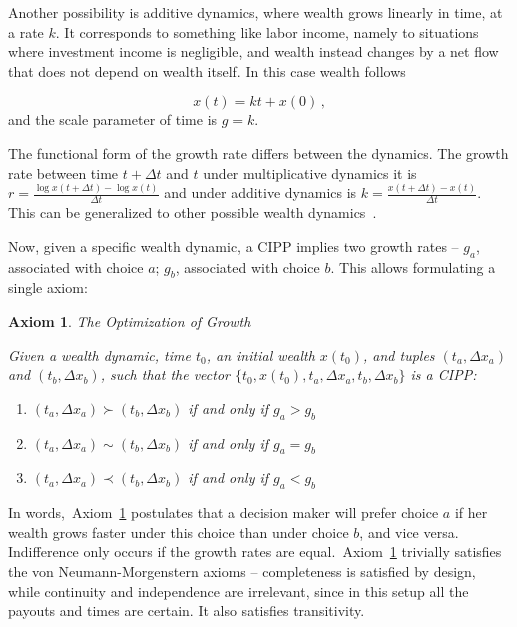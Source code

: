 \documentclass[11pt]{article}
\newtheorem{axiom}{Axiom}
\newcommand{\Aref}[1]{Axiom~\ref{ax:#1}}
\newcommand{\be}{\begin{equation}}
\newcommand{\ee}{\end{equation}}
\newcommand{\Dt}{\Delta t}
\newcommand{\Dx}{\Delta x}
\numberwithin{equation}{section}
\begin{document}
Another possibility is additive dynamics, where wealth grows linearly in time, at a rate $k$. It corresponds to something like labor income, namely to situations where investment income is negligible, and wealth instead changes by a net flow that does not depend on wealth itself. In this case wealth follows

\be
x\left(t\right) = k t + x\left(0\right)\,,
\ee
and the scale parameter of time is $g=k$.

The functional form of the growth rate differs between the dynamics. The growth rate between time $t+\Dt$ and $t$ under multiplicative dynamics it is $r = \frac{\log x(t+\Dt)-\log x(t)}{\Dt}$ and under additive dynamics is $k = \frac{x\left(t+\Dt\right)-x\left(t\right)}{\Dt}$. This can be generalized to other possible wealth dynamics~\citep{peters2016evaluating,peters2018time}.

Now, given a specific wealth dynamic, a CIPP implies two growth rates -- $g_a$, associated with choice $a$; $g_b$, associated with choice $b$. This allows formulating a single axiom:

\begin{axiom}{The Optimization of Growth}

Given a wealth dynamic, time $t_0$, an initial wealth $x\left(t_0\right)$, and tuples $\left(t_a,\Dx_a\right)$ and $\left(t_b,\Dx_b\right)$, such that the vector $\{t_0,x\left(t_0\right),t_a,\Dx_a,t_b,\Dx_b\}$ is a CIPP:

\begin{enumerate}
\item $\left(t_a,\Dx_a\right) \succ \left(t_b,\Dx_b\right)$ if and only if $g_a > g_b$
\item $\left(t_a,\Dx_a\right) \sim \left(t_b,\Dx_b\right)$ if and only if $g_a = g_b$
\item $\left(t_a,\Dx_a\right) \prec \left(t_b,\Dx_b\right)$ if and only if $g_a < g_b$
\end{enumerate}
\label{ax:ax1}
\end{axiom}

In words,~\Aref{ax1} postulates that a decision maker will prefer choice $a$ if her wealth grows faster under this choice than under choice $b$, and vice versa. Indifference only occurs if the growth rates are equal.~\Aref{ax1} trivially satisfies the von Neumann-Morgenstern axioms -- completeness is satisfied by design, while continuity and independence are irrelevant, since in this setup all the payouts and times are certain. It also satisfies transitivity.
\end{document}
